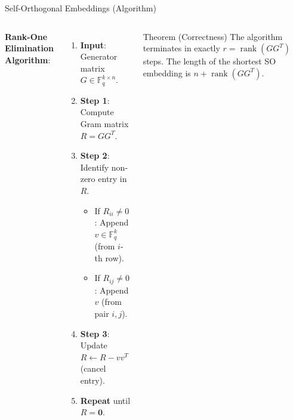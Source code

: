 \documentclass[10pt, aspectratio=169]{beamer}
\newcommand{\rank}{\operatorname{rank}}
\begin{document}
\begin{frame}{Self-Orthogonal Embeddings (Algorithm)}
    \begin{columns}
        \textbf{Rank-One Elimination Algorithm}:
        \begin{enumerate}
            \item \textbf{Input}: Generator matrix $G \in \mathbb{F}_q^{k \times n}$.
            \item \textbf{Step 1}: Compute Gram matrix $R = G G^T$.
            \item \textbf{Step 2}: Identify non-zero entry in $R$.
                \begin{itemize} \footnotesize
                    \item If $R_{ii} \ne 0$: Append $v \in \mathbb{F}_q^k$ (from $i$-th row).
                    \item If $R_{ij} \ne 0$: Append $v$ (from pair $i,j$).
                \end{itemize}
            \item \textbf{Step 3}: Update $R \gets R - vv^T$ (cancel entry).
            \item \textbf{Repeat} until $R = \mathbf{0}$.
        \end{enumerate}

        \begin{alertblock}{Theorem (Correctness)}
            The algorithm terminates in exactly $r = \rank(G G^T)$ steps. The length of the shortest SO embedding is \textbf{$n + \rank(G G^T)$}.
        \end{alertblock}
    \end{columns}
\end{frame}
\end{document}
